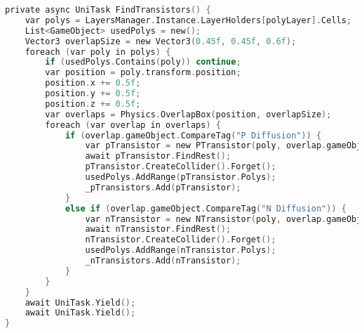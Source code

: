 \begin{lstlisting}[language={C},label=lst:find_transistors,caption={Metoda \texttt{FindTransistors} wyszukjąca tranzystory na schemacie}]
private async UniTask FindTransistors() {
    var polys = LayersManager.Instance.LayerHolders[polyLayer].Cells;
    List<GameObject> usedPolys = new();
    Vector3 overlapSize = new Vector3(0.45f, 0.45f, 0.6f);
    foreach (var poly in polys) {
        if (usedPolys.Contains(poly)) continue;
        var position = poly.transform.position;
        position.x += 0.5f;
        position.y += 0.5f;
        position.z += 0.5f;
        var overlaps = Physics.OverlapBox(position, overlapSize);
        foreach (var overlap in overlaps) {
            if (overlap.gameObject.CompareTag("P Diffusion")) {
                var pTransistor = new PTransistor(poly, overlap.gameObject); 
                await pTransistor.FindRest();
                pTransistor.CreateCollider().Forget();
                usedPolys.AddRange(pTransistor.Polys);
                _pTransistors.Add(pTransistor);
            }
            else if (overlap.gameObject.CompareTag("N Diffusion")) {
                var nTransistor = new NTransistor(poly, overlap.gameObject);
                await nTransistor.FindRest();
                nTransistor.CreateCollider().Forget();
                usedPolys.AddRange(nTransistor.Polys);
                _nTransistors.Add(nTransistor);
            }
        }
    }
    await UniTask.Yield();
    await UniTask.Yield();
}

\end{lstlisting}